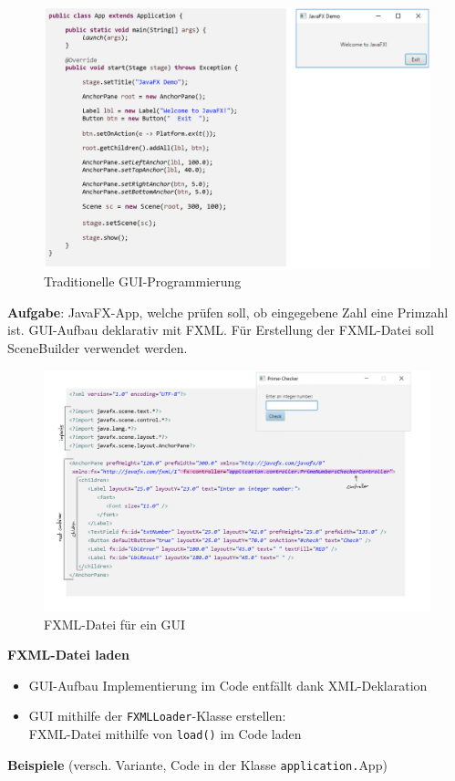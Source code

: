 \documentclass[a4paper]{article}
\begin{document}
		\begin{figure}[!htb]
			\centering
			\includegraphics[keepaspectratio, width=\textwidth]{img/gui/gui.png}
			\caption{Traditionelle GUI-Programmierung}
			\label{fig:tradgui}
		\end{figure}
		
		\newpage
		\noindent
		\textbf{Aufgabe}: JavaFX-App, welche prüfen soll, ob eingegebene Zahl eine Primzahl ist. 
		GUI-Aufbau deklarativ mit FXML. 
		Für Erstellung der FXML-Datei soll SceneBuilder verwendet werden.
		
		\begin{figure}[!htb]
			\centering
			\includegraphics[keepaspectratio, width=\textwidth]{img/gui/fxml.jpg}
			\caption{FXML-Datei für ein GUI}
			\label{fig:fxmlgui}
		\end{figure}
		\textbf{FXML-Datei laden}
		\begin{itemize}
			\item GUI-Aufbau Implementierung im Code entfällt dank XML-Deklaration
			\item GUI mithilfe der \texttt{FXMLLoader}-Klasse erstellen:\\
			FXML-Datei mithilfe von \texttt{load()} im Code laden
		\end{itemize}
		\noindent
		\textbf{Beispiele} (versch. Variante, Code in der Klasse \texttt{application.}App)
		
\end{document}

